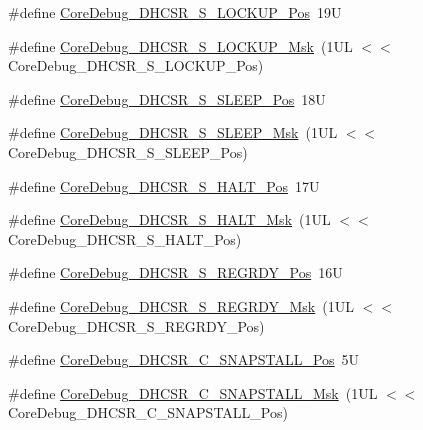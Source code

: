 \begin{DoxyCompactItemize}
\item 
\#define \mbox{\hyperlink{group___c_m_s_i_s___core_debug_ga2900dd56a988a4ed27ad664d5642807e}{Core\+Debug\+\_\+\+D\+H\+C\+S\+R\+\_\+\+S\+\_\+\+L\+O\+C\+K\+U\+P\+\_\+\+Pos}}~19U
\item 
\#define \mbox{\hyperlink{group___c_m_s_i_s___core_debug_ga7b67e4506d7f464ef5dafd6219739756}{Core\+Debug\+\_\+\+D\+H\+C\+S\+R\+\_\+\+S\+\_\+\+L\+O\+C\+K\+U\+P\+\_\+\+Msk}}~(1\+U\+L $<$$<$ Core\+Debug\+\_\+\+D\+H\+C\+S\+R\+\_\+\+S\+\_\+\+L\+O\+C\+K\+U\+P\+\_\+\+Pos)
\item 
\#define \mbox{\hyperlink{group___c_m_s_i_s___core_debug_ga349ccea33accc705595624c2d334fbcb}{Core\+Debug\+\_\+\+D\+H\+C\+S\+R\+\_\+\+S\+\_\+\+S\+L\+E\+E\+P\+\_\+\+Pos}}~18U
\item 
\#define \mbox{\hyperlink{group___c_m_s_i_s___core_debug_ga98d51538e645c2c1a422279cd85a0a25}{Core\+Debug\+\_\+\+D\+H\+C\+S\+R\+\_\+\+S\+\_\+\+S\+L\+E\+E\+P\+\_\+\+Msk}}~(1\+U\+L $<$$<$ Core\+Debug\+\_\+\+D\+H\+C\+S\+R\+\_\+\+S\+\_\+\+S\+L\+E\+E\+P\+\_\+\+Pos)
\item 
\#define \mbox{\hyperlink{group___c_m_s_i_s___core_debug_ga760a9a0d7f39951dc3f07d01f1f64772}{Core\+Debug\+\_\+\+D\+H\+C\+S\+R\+\_\+\+S\+\_\+\+H\+A\+L\+T\+\_\+\+Pos}}~17U
\item 
\#define \mbox{\hyperlink{group___c_m_s_i_s___core_debug_ga9f881ade3151a73bc5b02b73fe6473ca}{Core\+Debug\+\_\+\+D\+H\+C\+S\+R\+\_\+\+S\+\_\+\+H\+A\+L\+T\+\_\+\+Msk}}~(1\+U\+L $<$$<$ Core\+Debug\+\_\+\+D\+H\+C\+S\+R\+\_\+\+S\+\_\+\+H\+A\+L\+T\+\_\+\+Pos)
\item 
\#define \mbox{\hyperlink{group___c_m_s_i_s___core_debug_ga20a71871ca8768019c51168c70c3f41d}{Core\+Debug\+\_\+\+D\+H\+C\+S\+R\+\_\+\+S\+\_\+\+R\+E\+G\+R\+D\+Y\+\_\+\+Pos}}~16U
\item 
\#define \mbox{\hyperlink{group___c_m_s_i_s___core_debug_gac4cd6f3178de48f473d8903e8c847c07}{Core\+Debug\+\_\+\+D\+H\+C\+S\+R\+\_\+\+S\+\_\+\+R\+E\+G\+R\+D\+Y\+\_\+\+Msk}}~(1\+U\+L $<$$<$ Core\+Debug\+\_\+\+D\+H\+C\+S\+R\+\_\+\+S\+\_\+\+R\+E\+G\+R\+D\+Y\+\_\+\+Pos)
\item 
\#define \mbox{\hyperlink{group___c_m_s_i_s___core_debug_ga85747214e2656df6b05ec72e4d22bd6d}{Core\+Debug\+\_\+\+D\+H\+C\+S\+R\+\_\+\+C\+\_\+\+S\+N\+A\+P\+S\+T\+A\+L\+L\+\_\+\+Pos}}~5U
\item 
\#define \mbox{\hyperlink{group___c_m_s_i_s___core_debug_ga53aa99b2e39a67622f3b9973e079c2b4}{Core\+Debug\+\_\+\+D\+H\+C\+S\+R\+\_\+\+C\+\_\+\+S\+N\+A\+P\+S\+T\+A\+L\+L\+\_\+\+Msk}}~(1\+U\+L $<$$<$ Core\+Debug\+\_\+\+D\+H\+C\+S\+R\+\_\+\+C\+\_\+\+S\+N\+A\+P\+S\+T\+A\+L\+L\+\_\+\+Pos)
$$
\end{DoxyCompactItemize}
